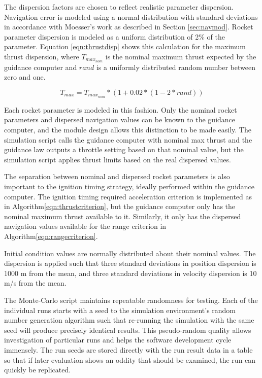 The dispersion factors are chosen to reflect realistic parameter dispersion. Navigation error is modeled using a normal distribution with standard deviations in accordance with Moesser's\:\cite{MOESSER} work as described in Section \ref{sec:navmod}. Rocket parameter dispersion is modeled as a uniform distribution of 2\% of the parameter. Equation \ref{eqn:thrustdisp} shows this calculation for the maximum thrust dispersion, where $T_{max_{nom}}$ is the nominal maximum thrust expected by the guidance computer and $rand$ is a uniformly distributed random number between zero and one.

\begin{equation}
\label{eqn:thrustdisp}
T_{max} = T_{max_{nom}}*(1+0.02*(1-2*rand))
\end{equation}

Each rocket parameter is modeled in this fashion. Only the nominal rocket parameters and dispersed navigation values can be known to the guidance computer, and the module design allows this distinction to be made easily. The simulation script calls the guidance computer with nominal max thrust and the guidance law outputs a throttle setting based on that nominal value, but the simulation script applies thrust limits based on the real dispersed values. 

The separation between nominal and dispersed rocket parameters is also important to the ignition timing strategy, ideally performed within the guidance computer. The ignition timing required acceleration criterion is implemented as in Algorithm\:\ref{eqn:thrustcriterion}, but the guidance computer only has the nominal maximum thrust available to it. Similarly, it only has the dispersed navigation values available for the range criterion in Algorithm\:\ref{eqn:rangecriterion}.

Initial condition values are normally distributed about their nominal values. The dispersion is applied such that three standard deviations in position dispersion is 1000 m from the mean, and three standard deviations in velocity dispersion is 10 m/s from the mean. 

The Monte-Carlo script maintains repeatable randomness for testing. Each of the individual runs starts with a seed to the simulation environment's random number generation algorithm such that re-running the simulation with the same seed will produce precisely identical results. This pseudo-random quality allows investigation of particular runs and helps the software development cycle immensely. The run seeds are stored directly with the run result data in a table so that if later evaluation shows an oddity that should be examined, the run can quickly be replicated.

